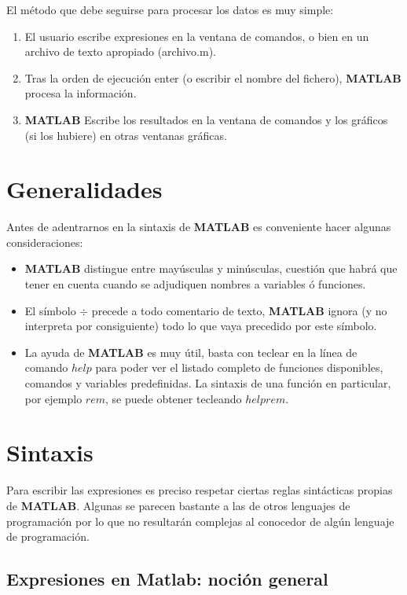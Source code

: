 El método que debe seguirse para procesar los datos es muy simple:
\begin{enumerate}
\item El usuario escribe expresiones en la ventana de comandos, o bien en un archivo de
texto apropiado (archivo.m).
\item Tras la orden de ejecución enter (o escribir el nombre del fichero), \textbf{MATLAB} procesa
la información.
\item \textbf{MATLAB} Escribe los resultados en la ventana de comandos y los gráficos (si los hubiere) en otras ventanas gráficas.
\end{enumerate}

\section{Generalidades}

Antes de adentrarnos en la sintaxis de \textbf{MATLAB} es conveniente hacer algunas consideraciones:

\begin{itemize}
\item \textbf{MATLAB} distingue entre mayúsculas y minúsculas, cuestión que habrá que tener en cuenta cuando se adjudiquen nombres a variables ó funciones.
\item El símbolo $\div$ precede a todo comentario de texto, \textbf{MATLAB} ignora (y no interpreta por consiguiente) todo lo que vaya precedido por este símbolo.
\item La ayuda de \textbf{MATLAB} es muy útil, basta con teclear en la línea de comando $help$ para poder ver el listado completo de funciones disponibles, comandos y variables predefinidas. La sintaxis de una función en particular, por ejemplo $rem$, se puede obtener tecleando $help rem$.
\end{itemize}

\section{Sintaxis}

Para escribir las expresiones es preciso respetar ciertas reglas sintácticas propias de \textbf{MATLAB}. Algunas se parecen bastante a las de otros lenguajes de programación por lo que no resultarán complejas al conocedor de algún lenguaje de programación.

\subsection{Expresiones en Matlab: noción general}

